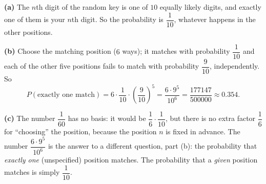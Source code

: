 \textbf{(a)} The $n$th digit of the random key is one of $10$ equally likely digits, and exactly one of them is your $n$th digit. So the probability is $\boxed{\dfrac{1}{10}}$, whatever happens in the other positions.

\textbf{(b)} Choose the matching position ($6$ ways); it matches with probability $\dfrac{1}{10}$ and each of the other five positions fails to match with probability $\dfrac{9}{10}$, independently. So
\[
P(\text{exactly one match})=6\cdot\dfrac{1}{10}\cdot\left(\dfrac{9}{10}\right)^5=\dfrac{6\cdot9^5}{10^6}=\boxed{\dfrac{177147}{500000}}\approx0.354 .
\]

\textbf{(c)} The number $\dfrac{1}{60}$ has no basis: it would be $\dfrac{1}{6}\cdot\dfrac{1}{10}$, but there is no extra factor $\dfrac{1}{6}$ for ``choosing'' the position, because the position $n$ is fixed in advance. The number $\dfrac{6\cdot9^5}{10^6}$ is the answer to a different question, part (b): the probability that \emph{exactly one} (unspecified) position matches. The probability that a \emph{given} position matches is simply $\dfrac{1}{10}$.

